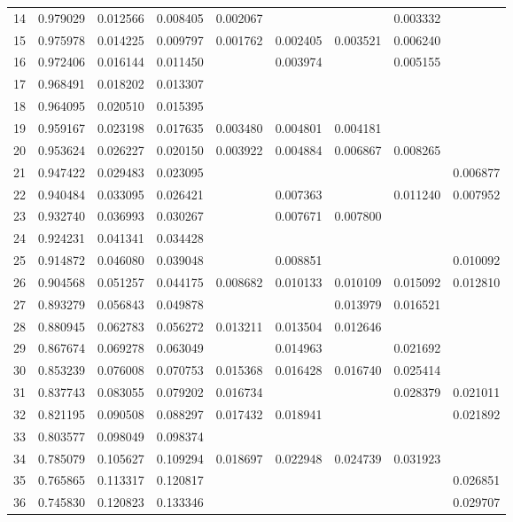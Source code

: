 \documentclass{elsarticle}
\begin{document}
\begin{center}
\begin{longtable}{|c|ccc|cccc|c|}
  14 & 0.979029 & 0.012566 & 0.008405 & 0.002067 &  &  & 0.003332 &  \\
  15 & 0.975978 & 0.014225 & 0.009797 & 0.001762 & 0.002405 & 0.003521 & 0.006240 &  \\
  16 & 0.972406 & 0.016144 & 0.011450 &  & 0.003974 &  & 0.005155 &  \\
  17 & 0.968491 & 0.018202 & 0.013307 &  &  &  &  &  \\
  18 & 0.964095 & 0.020510 & 0.015395 &  &  &  &  &  \\
  19 & 0.959167 & 0.023198 & 0.017635 & 0.003480 & 0.004801 & 0.004181 &  &  \\
  20 & 0.953624 & 0.026227 & 0.020150 & 0.003922 & 0.004884 & 0.006867 & 0.008265 &  \\
  21 & 0.947422 & 0.029483 & 0.023095 &  &  &  &  & 0.006877 \\
  22 & 0.940484 & 0.033095 & 0.026421 &  & 0.007363 &  & 0.011240 & 0.007952 \\
  23 & 0.932740 & 0.036993 & 0.030267 &  & 0.007671 & 0.007800 &  &  \\
  24 & 0.924231 & 0.041341 & 0.034428 &  &  &  &  &  \\
  25 & 0.914872 & 0.046080 & 0.039048 &  & 0.008851 &  &  & 0.010092 \\
  26 & 0.904568 & 0.051257 & 0.044175 & 0.008682 & 0.010133 & 0.010109 & 0.015092 & 0.012810 \\
  27 & 0.893279 & 0.056843 & 0.049878 &  &  & 0.013979 & 0.016521 &  \\
  28 & 0.880945 & 0.062783 & 0.056272 & 0.013211 & 0.013504 & 0.012646 &  &  \\
  29 & 0.867674 & 0.069278 & 0.063049 &  & 0.014963 &  & 0.021692 &  \\
  30 & 0.853239 & 0.076008 & 0.070753 & 0.015368 & 0.016428 & 0.016740 & 0.025414 &  \\
  31 & 0.837743 & 0.083055 & 0.079202 & 0.016734 &  &  & 0.028379 & 0.021011 \\
  32 & 0.821195 & 0.090508 & 0.088297 & 0.017432 & 0.018941 &  &  & 0.021892 \\
  33 & 0.803577 & 0.098049 & 0.098374 &  &  &  &  &  \\
  34 & 0.785079 & 0.105627 & 0.109294 & 0.018697 & 0.022948 & 0.024739 & 0.031923 &  \\
  35 & 0.765865 & 0.113317 & 0.120817 &  &  &  &  & 0.026851 \\
  36 & 0.745830 & 0.120823 & 0.133346 &  &  &  &  & 0.029707 \\

\end{longtable}
\end{center}
\end{document}
